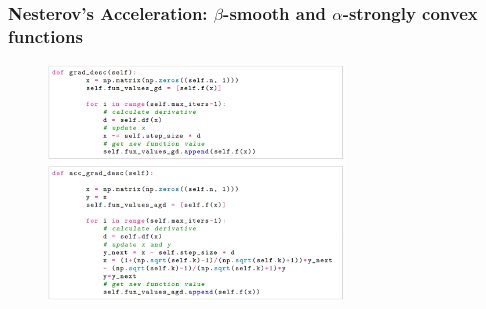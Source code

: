 \begin{frame}
\frametitle{ Nesterov’s Acceleration: $\beta$-smooth and $\alpha$-strongly convex functions}
    \begin{figure}[h]
    \centering
    \includegraphics[width=0.7\textwidth]{./figures/fig_code.png}
    \end{figure}
\end{frame}

